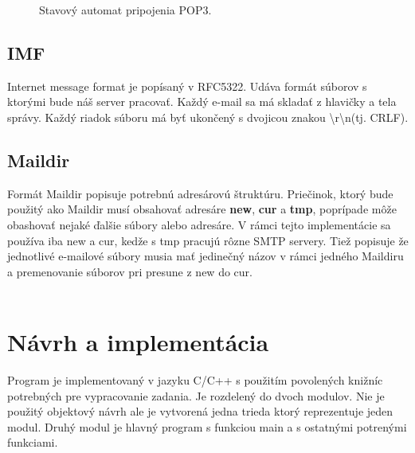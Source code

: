 \documentclass[11pt,a4paper]{article}
\begin{document}
\begin{figure}[h]
  \centering
  \caption{Stavový automat pripojenia POP3.}
  \label{fig:pop3FSM}
\end{figure}


\subsection{IMF}
Internet message format je popísaný v RFC5322\cite{imf}. Udáva formát súborov s ktorými bude náš server pracovať. Každý e-mail sa má skladať z hlavičky a tela správy. Každý riadok súboru má byť ukončený s dvojicou znakou \textbackslash r\textbackslash n(tj. CRLF). 


\subsection{Maildir}
Formát Maildir\cite{maildir} popisuje potrebnú adresárovú štruktúru. Priečinok, ktorý bude použitý ako Maildir musí obsahovať adresáre \textbf{new}, \textbf{cur} a \textbf{tmp}, poprípade môže obashovať nejaké ďalšie súbory alebo adresáre. V rámci tejto implementácie sa používa iba new a cur, kedže s tmp pracujú rôzne SMTP servery. Tiež popisuje že jednotlivé e-mailové súbory musia mať jedinečný názov v rámci jedného Maildiru a premenovanie súborov pri presune z new do cur.\\\\




\section{Návrh a implementácia}
Program je implementovaný v jazyku C/C++ s použitím povolených knižníc potrebných pre vypracovanie zadania. Je rozdelený do dvoch modulov. Nie je použitý objektový návrh ale je vytvorená jedna trieda ktorý reprezentuje jeden modul. Druhý modul je hlavný program s funkciou main a s ostatnými potrenými funkciami.   
\end{document}
